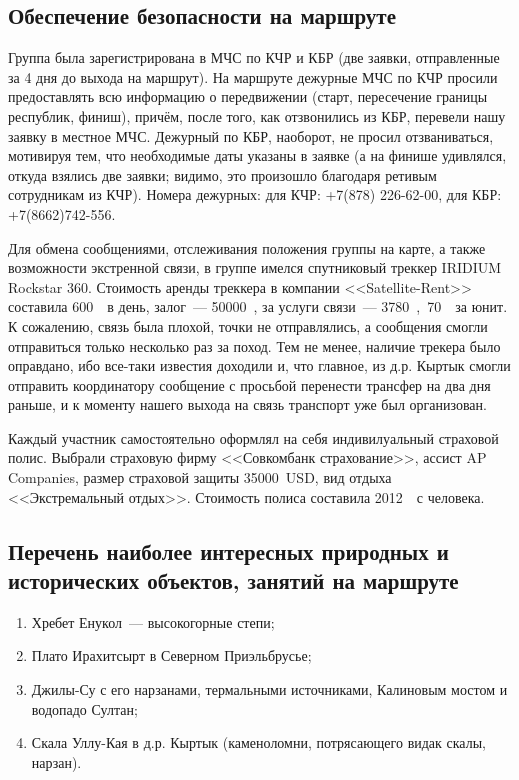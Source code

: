 \subsection{Обеспечение безопасности на маршруте}
Группа была зарегистрирована в МЧС по КЧР и КБР (две заявки, отправленные за 4 дня до выхода на маршрут). На маршруте дежурные МЧС по КЧР просили предоставлять всю информацию о передвижении (старт, пересечение границы республик, финиш), причём, после того, как отзвонились из КБР, перевели нашу заявку в местное МЧС. Дежурный по КБР, наоборот, не просил отзваниваться, мотивируя тем, что необходимые даты указаны в заявке (а на финише удивлялся, откуда взялись две заявки; видимо, это произошло благодаря ретивым сотрудникам из КЧР). Номера дежурных: для КЧР: +7(878) 226-62-00, для КБР: +7(8662)742-556.

Для обмена сообщениями, отслеживания положения группы на карте, а также возможности экстренной связи, в группе имелся спутниковый треккер IRIDIUM Rockstar 360. Стоимость аренды треккера в компании <<Satellite-Rent>> составила 600~\faRub~в день, залог~--- 50000~\faRub, за услуги связи~--- 3780~\faRuble,~70~\faRub~за юнит. К сожалению, связь была плохой, точки не отправлялись, а сообщения смогли отправиться только несколько раз за поход. Тем не менее, наличие трекера было оправдано, ибо все-таки известия доходили и, что главное, из д.р. Кыртык смогли отправить координатору сообщение с просьбой перенести трансфер на два дня раньше, и к моменту нашего выхода на связь транспорт уже был организован.

Каждый участник самостоятельно оформлял на себя индивилуальный страховой полис. Выбрали страховую фирму <<Совкомбанк страхование>>, ассист AP Companies, размер страховой защиты 35000~USD,  вид отдыха <<Экстремальный отдых>>. Стоимость полиса составила 2012~\faRuble~с человека.

\subsection{Перечень наиболее интересных природных и исторических объектов, занятий на маршруте}
\begin{enumerate}[noitemsep,topsep=0pt,parsep=0pt,partopsep=0pt]
	\item Хребет Енукол~--- высокогорные степи;
	\item Плато Ирахитсырт в Северном Приэльбрусье;
	\item Джилы-Су с его нарзанами, термальными источниками, Калиновым мостом и водопадо Султан;
	\item Скала Уллу-Кая в д.р. Кыртык (каменоломни, потрясающего видак скалы, нарзан).
\end{enumerate}

